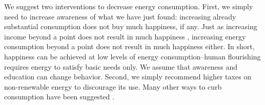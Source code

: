 \documentclass[10pt, letterpaper]{article}
\begin{document}
\begin{spacing}{1.0}



We suggest two interventions to decrease energy consumption. First, we simply
need to increase awareness of what we have just found: increasing
already substantial consumption does not buy much happiness, if any. Just as increasing  income
 beyond a point does not result in much happiness \citep{kahneman10}, increasing
 energy consumption beyond a point does not result in much happiness
 either. %
  In short, happiness can be achieved at low
 levels of energy consumption--human flourishing requires energy to satisfy
 basic needs only. We assume that awareness and education can change behavior.
 Second, we simply recommend higher taxes on non-renewable
 energy to discourage its use. Many other ways to
 curb consumption have been suggested \citep{dietz14B,dietz15,asensio15, dumas87,attari10}.




\end{spacing}
\end{document}
